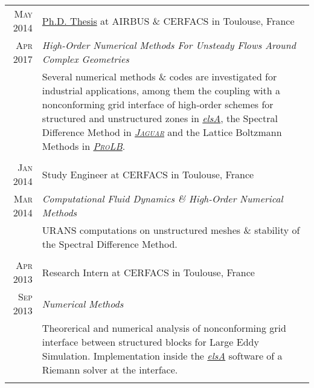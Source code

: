 \documentclass[a4paper,10pt]{article}
\begin{document}
\begin{tabular}{r|p{15cm}}
    \textsc{May 2014} & \href{http://pages.saclay.inria.fr/julien.vanharen/files/phd.pdf}{Ph.D. Thesis} at \textsc{AIRBUS} \& \textsc{CERFACS} in Toulouse, France \\
    \textsc{Apr 2017} & \emph{High-Order Numerical Methods For Unsteady Flows Around Complex Geometries}                                                           \\
                      & \footnotesize{Several numerical methods \& codes are investigated for industrial applications, among them the coupling with a
        nonconforming grid interface of high-order schemes for structured and unstructured
        zones in \href{http://elsa.onera.fr}{\emph{elsA}},
        the Spectral Difference Method in \href{http://www.cerfacs.fr/~puigt/jaguar.html}{\emph{\textsc{Jaguar}}}
        and the Lattice Boltzmann Methods in \href{http://www.prolb-cfd.com}{\emph{\textsc{ProLB}}}.}                                                              \\
    \multicolumn{2}{c}{}                                                                                                                                           \\

    \textsc{Jan 2014} & Study Engineer at \textsc{CERFACS} in Toulouse, France                                                                                     \\
    \textsc{Mar 2014} & \emph{Computational Fluid Dynamics \& High-Order Numerical Methods}                                                                        \\
                      & \footnotesize{URANS computations on unstructured meshes \& stability of the Spectral Difference Method.}                                   \\
    \multicolumn{2}{c}{}                                                                                                                                           \\

    \textsc{Apr 2013} & Research Intern at \textsc{CERFACS} in Toulouse, France                                                                                    \\
    \textsc{Sep 2013} & \emph{Numerical Methods}                                                                                                                   \\
                      & \footnotesize{Theorerical and numerical analysis of nonconforming grid interface between structured blocks
        for Large Eddy Simulation. Implementation inside the \href{http://elsa.onera.fr}{\emph{elsA}}
        software of a Riemann solver at the interface.}                                                                                                            \\
    \multicolumn{2}{c}{}                                                                                                                                           \\


\end{tabular}
\end{document}

